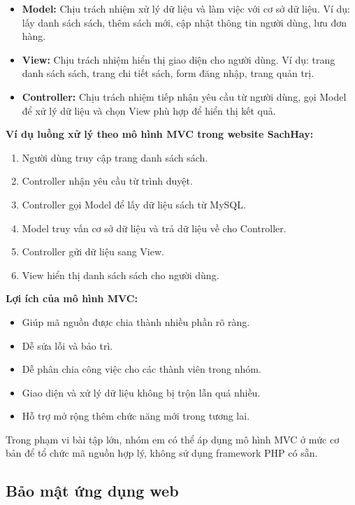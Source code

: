 \begin{itemize}
	\item \textbf{Model:} Chịu trách nhiệm xử lý dữ liệu và làm việc với cơ sở dữ liệu. Ví dụ: lấy danh sách sách, thêm sách mới, cập nhật thông tin người dùng, lưu đơn hàng.
	\item \textbf{View:} Chịu trách nhiệm hiển thị giao diện cho người dùng. Ví dụ: trang danh sách sách, trang chi tiết sách, form đăng nhập, trang quản trị.
	\item \textbf{Controller:} Chịu trách nhiệm tiếp nhận yêu cầu từ người dùng, gọi Model để xử lý dữ liệu và chọn View phù hợp để hiển thị kết quả.
\end{itemize}

\textbf{Ví dụ luồng xử lý theo mô hình MVC trong website SachHay:}

\begin{enumerate}
	\item Người dùng truy cập trang danh sách sách.
	\item Controller nhận yêu cầu từ trình duyệt.
	\item Controller gọi Model để lấy dữ liệu sách từ MySQL.
	\item Model truy vấn cơ sở dữ liệu và trả dữ liệu về cho Controller.
	\item Controller gửi dữ liệu sang View.
	\item View hiển thị danh sách sách cho người dùng.
\end{enumerate}

\textbf{Lợi ích của mô hình MVC:}

\begin{itemize}
	\item Giúp mã nguồn được chia thành nhiều phần rõ ràng.
	\item Dễ sửa lỗi và bảo trì.
	\item Dễ phân chia công việc cho các thành viên trong nhóm.
	\item Giao diện và xử lý dữ liệu không bị trộn lẫn quá nhiều.
	\item Hỗ trợ mở rộng thêm chức năng mới trong tương lai.
\end{itemize}

Trong phạm vi bài tập lớn, nhóm em có thể áp dụng mô hình MVC ở mức cơ bản để tổ chức mã nguồn hợp lý, không sử dụng framework PHP có sẵn.

\subsection{Bảo mật ứng dụng web}


